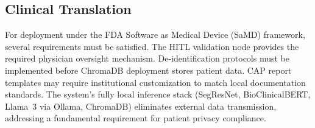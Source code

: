 \subsection{Clinical Translation}

For deployment under the FDA Software as Medical Device (SaMD) framework, several requirements must be satisfied. The HITL validation node provides the required physician oversight mechanism. De-identification protocols must be implemented before ChromaDB deployment stores patient data. CAP report templates may require institutional customization to match local documentation standards. The system's fully local inference stack (SegResNet, BioClinicalBERT, Llama~3 via Ollama, ChromaDB) eliminates external data transmission, addressing a fundamental requirement for patient privacy compliance.
